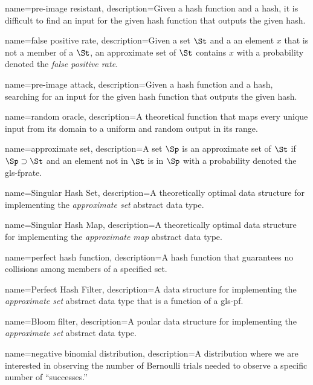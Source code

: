 {
    name={pre-image resistant},
    description={Given a hash function and a hash, it is difficult to find an input for the given hash function that outputs the given hash.}
}

{
    name={false positive rate},
    description={Given a set $\St$ and a an element $x$ that is not a member of a $\St$, an approximate set of $\St$ contains $x$ with a probability denoted the \emph{false positive rate}}.
}

{
    name={pre-image attack},
    description={Given a hash function and a hash, searching for an input for the given hash function that outputs the given hash.}
}

{
    name={random oracle},
    description={A theoretical function that maps every unique input from its domain to a uniform and random output in its range.}
}

{
    name={approximate set},
    description={A set $\Sp$ is an approximate set of $\St$ if $\Sp \supset \St$ and an element not in $\St$ is in $\Sp$ with a probability denoted the \gls*{gls-fprate}.}
}

{
    name={Singular Hash Set},
    description={A theoretically optimal data structure for implementing the \emph{approximate set} abstract data type.}
}

{
    name={Singular Hash Map},
    description={A theoretically optimal data structure for implementing the \emph{approximate map} abstract data type.}
}

{
    name={perfect hash function},
    description={A hash function that guarantees no collisions among members of a specified set.}
}

{
    name={Perfect Hash Filter},
    description={A data structure for implementing the \emph{approximate set} abstract data type that is a function of a \gls*{gls-pf}.}
}

{
    name={Bloom filter},
    description={A poular data structure for implementing the \emph{approximate set} abstract data type.}
}

{
    name={negative binomial distribution},
    description={A distribution where we are interested in observing the number of Bernoulli trials needed to observe a specific number of ``successes.''}
}

